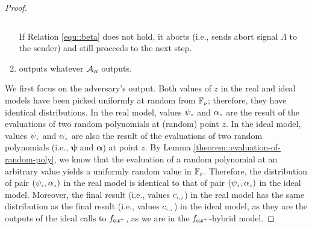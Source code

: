 \begin{proof}
\begin{enumerate}
\begin{equation}
 \end{equation}
%







%
 If Relation \ref{equ::beta} does not hold, it aborts (i.e., sends abort signal $\Lambda$ to the sender) and still proceeds to the next step. 
 
 \item outputs whatever $\mathcal{A}_{\scriptscriptstyle R}$ outputs. 
%
\end{enumerate}

We first focus on the adversary's output. Both values of $z$ in the real and ideal models have been picked uniformly at random from $\mathbb{F}_{\scriptscriptstyle p}$; therefore, they have identical distributions. In the real model, values  $\psi_{\scriptscriptstyle z}$ and $\alpha_{\scriptscriptstyle z}$ are the result of the evaluations of two random polynomials at (random) point $z$. In the ideal model, values $\psi_{\scriptscriptstyle  z}$ and $\alpha_{\scriptscriptstyle z}$ are also the result of the evaluations of two random polynomials (i.e., ${\bm\psi}$ and ${\bm\alpha}$) at point $ z$.  By Lemma \ref{theorem::evaluation-of-random-poly}, we know that the evaluation of a random polynomial at an arbitrary value  
 yields a uniformly random value in $\mathbb{F}_{\scriptscriptstyle p}$. Therefore, the distribution of pair $(\psi_{\scriptscriptstyle z}, \alpha_{\scriptscriptstyle z})$ in the real model is identical to that of pair $( \psi_{\scriptscriptstyle  z}, \alpha_{\scriptscriptstyle  z})$ in the ideal model. Moreover, the final result (i.e., values ${c}_{\scriptscriptstyle i,j}$) in the real model has the same distribution as the final result (i.e., values ${c}_{\scriptscriptstyle i,j}$)  in the ideal model, as they are the outputs of the ideal calls to $f_{\scriptscriptstyle \mathtt{OLE}^{\scriptscriptstyle +}}$, as we are in the $f_{\scriptscriptstyle \mathtt{OLE}^{\scriptscriptstyle +}}$-hybrid model. 


\end{proof}
